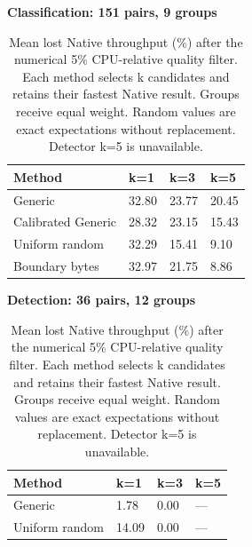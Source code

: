 \begin{table}[t]
\centering
\caption{Mean lost Native throughput (\%) after the numerical 5\% CPU-relative quality filter. Each method selects k candidates and retains their fastest Native result. Groups receive equal weight. Random values are exact expectations without replacement. Detector k=5 is unavailable.}
\label{tab:budget}
\begingroup\small\setlength{\tabcolsep}{3pt}
\par\smallskip\textbf{Classification: 151 pairs, 9 groups}\par\smallskip
\begin{tabular}{llll}
\toprule
Method & k=1 & k=3 & k=5 \\
\midrule
Generic & 32.80 & 23.77 & 20.45 \\
Calibrated Generic & 28.32 & 23.15 & 15.43 \\
Uniform random & 32.29 & 15.41 & 9.10 \\
Boundary bytes & 32.97 & 21.75 & 8.86 \\
\bottomrule
\end{tabular}
\par\smallskip\textbf{Detection: 36 pairs, 12 groups}\par\smallskip
\begin{tabular}{llll}
\toprule
Method & k=1 & k=3 & k=5 \\
\midrule
Generic & 1.78 & 0.00 & --- \\
Uniform random & 14.09 & 0.00 & --- \\
\bottomrule
\end{tabular}
\endgroup
\end{table}
